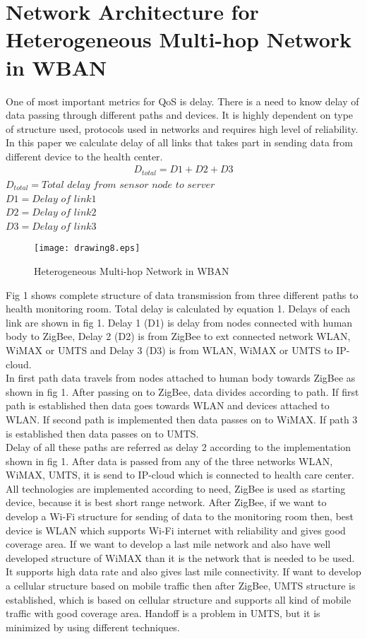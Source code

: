 \documentclass[11pt, conference, compsocconf, onecolumn]{IEEEtran}
\begin{document}
\section{Network Architecture for Heterogeneous Multi-hop Network in WBAN}
One of most important metrics for QoS is delay. There is a need to know delay of data passing through different paths and devices. It is highly dependent on type of structure used, protocols used in networks and requires high level of reliability. In this paper we calculate delay of all links that takes part in sending data from different device to the health center.
\begin{eqnarray}
D_{total}= D1+D2+D3
\end{eqnarray}
$D_{total}= Total$ $delay$ $from$ $sensor$ $node$ $to$ $server$
\\
$D1=Delay$ $of$ $link 1$
\\
$D2=Delay$ $of$ $link 2$
\\
$D3=Delay$ $of$ $link 3$
\\
\begin{figure}[!h]
\centering
\caption{Heterogeneous Multi-hop Network in WBAN}
\texttt{[image: drawing8.eps]}
\end{figure}
\indent Fig 1 shows complete structure of data transmission from three different paths to health monitoring room. Total delay is calculated by equation 1. Delays of each link are shown in fig 1. Delay 1 (D1) is delay from nodes connected with human body to ZigBee, Delay 2 (D2) is from ZigBee to ext connected network WLAN, WiMAX or UMTS and Delay 3 (D3) is from WLAN, WiMAX or UMTS to IP-cloud. \\
\indent In first path data travels from nodes attached to human body  towards ZigBee as shown in fig 1. After passing on to ZigBee, data divides according to path. If first path is established then data goes towards WLAN and devices attached to WLAN. If second path is implemented then data passes on to WiMAX. If path 3 is established then data passes on to UMTS.\\
\indent Delay of all these paths are referred as delay 2 according to the implementation shown in fig 1. After data is passed from any of the three networks WLAN, WiMAX, UMTS, it is send to IP-cloud which is connected to health care center.\\
\indent All technologies are implemented according to need, ZigBee is used as starting device, because it is best short range network. After ZigBee, if we want to develop a Wi-Fi structure for sending of data to the monitoring room then, best device is WLAN which supports Wi-Fi internet with reliability and gives good coverage area. If we want to develop a last mile network and also have well developed structure of WiMAX than it is the network that is needed to be used. It supports high data rate and also gives last mile connectivity. If want to develop a cellular structure based on mobile traffic then after ZigBee, UMTS structure is established, which is based on cellular structure and supports all kind of mobile traffic with good coverage area. Handoff is a problem in UMTS, but it is minimized by using different techniques.
\end{document}
